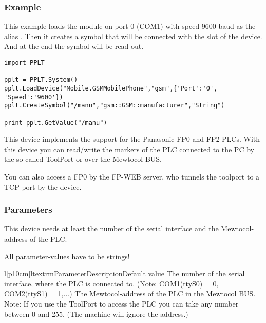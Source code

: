 \subsubsection{Example}
This example loads the  module on port 0 (COM1) with 
speed 9600 baud as the alias . Then it creates a symbol 
 that will be connected with the  slot of the 
device. And at the end the symbol will be read out.
\begin{verbatim}
import PPLT

pplt = PPLT.System()
pplt.LoadDevice("Mobile.GSMMobilePhone","gsm",{'Port':'0', 'Speed':'9600'})
pplt.CreateSymbol("/manu","gsm::GSM::manufacturer","String")

print pplt.GetValue("/manu")
\end{verbatim}






This device implements the support for the Panasonic FP0 and FP2 PLCs. With 
this device you can read/write the markers of the PLC connected to the PC by 
the so called ToolPort or over the Mewtocol-BUS. 

You can also access a FP0 by the FP-WEB server, who tunnels the toolport to a 
TCP port by the  device. 

\subsubsection{Parameters}
This device needs at least the number of the serial interface and
the Mewtocol-address of the PLC.
\begin{notice}
All parameter-values have to be strings!
\end{notice}

\begin{tableiii}{l|p{10cm}|l}{textrm}{Parameter}{Description}{Default value}
        {The number of the serial interface, where the PLC is connected to. 
        (Note: COM1(ttyS0) = 0, COM2(ttyS1) = 1,...)}
        {}
        {The Mewtocol-address of the PLC in the Mewtocol BUS. Note: If you use
        the ToolPort to access the PLC you can take any number between 0 and
        255. (The machine will ignore the address.)}
        {}
\end{tableiii}

